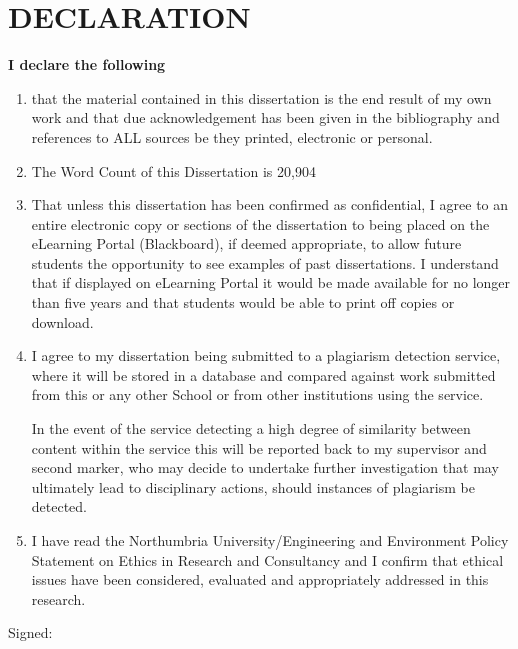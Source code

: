 \chapter{DECLARATION}

\textbf{\large{I declare the following}}
\begin{enumerate}
	\item that the material contained in this dissertation is the end result of my own work and that
	due acknowledgement has been given in the bibliography and references to ALL sources be
	they printed, electronic or personal.
	
	\item The Word Count of this Dissertation is 20,904
	
	\item That unless this dissertation has been confirmed as confidential, I agree to an entire
	electronic copy or sections of the dissertation to being placed on the eLearning Portal
	(Blackboard), if deemed appropriate, to allow future students the opportunity to see examples
	of past dissertations. I understand that if displayed on eLearning Portal it would be made
	available for no longer than five years and that students would be able to print off copies or
	download.
	
	\item I agree to my dissertation being submitted to a plagiarism detection service, where it will
	be stored in a database and compared against work submitted from this or any other School
	or from other institutions using the service.
	
	In the event of the service detecting a high degree of similarity between content within the
	service this will be reported back to my supervisor and second marker, who may decide to
	undertake further investigation that may ultimately lead to disciplinary actions, should
	instances of plagiarism be detected.
	
	\item I have read the Northumbria University/Engineering and Environment Policy Statement on
	Ethics in Research and Consultancy and I confirm that ethical issues have been considered,
	evaluated and appropriately addressed in this research. \\ 
\end{enumerate}


Signed: \hrulefill \\

\hspace*{0mm}\phantom{Signed: }




